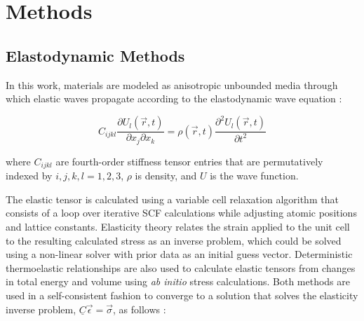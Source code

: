 \documentclass[final,3p,times]{elsarticle}
\begin{document}
\section{Methods}


\subsection{Elastodynamic Methods}
In this work, materials are modeled as anisotropic unbounded media through which elastic waves propagate according to the elastodynamic wave equation \cite{du2017facile}:

\begin{equation}
    C_{ijkl} \frac{\partial U_l(\vec{r},t)}{\partial x_j\partial x_k}= \rho(\vec{r},t)\frac{\partial^2 U_l(\vec{r},t)}{\partial t^2}
    \label{eqn:ewe}
\end{equation}

where $C_{ijkl}$ are fourth-order stiffness tensor entries that are permutatively indexed by $i,j,k,l=1,2,3$, $\rho$ is density, and $U$ is the wave function.

The elastic tensor is calculated using a variable cell relaxation algorithm that consists of a loop over iterative SCF calculations while adjusting atomic positions and lattice constants. Elasticity theory relates the strain applied to the unit cell to the resulting calculated stress as an inverse problem, which could be solved using a non-linear solver with prior data as an initial guess vector. Deterministic thermoelastic relationships are also used to calculate elastic tensors from changes in total energy and volume using \textit{ab initio} stress calculations. Both methods are used in a self-consistent fashion to converge to a solution that solves the elasticity inverse problem, $\underline{C}\vec{\epsilon} = \vec{\sigma}$, as follows \cite{timoshenko1951theory, mit1620}: 
\end{document}
